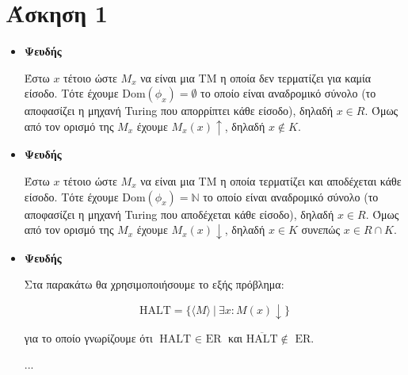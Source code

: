 \documentclass[a4paper, oneside, 11pt]{article}
\begin{document}
\section*{Άσκηση 1}

\begin{itemize}
   \item \textbf{Ψευδής}
   
         Έστω $x$ τέτοιο ώστε $M_x$ να είναι μια TM η οποία δεν τερματίζει για καμία
         είσοδο.  Τότε έχουμε $\text{Dom}(\phi_x) = \emptyset$ το οποίο είναι
         αναδρομικό σύνολο (το αποφασίζει η μηχανή Turing που απορρίπτει κάθε
         είσοδο), δηλαδή $x \in R$. Όμως από τον ορισμό της $M_x$ έχουμε $M_x(x)
         \uparrow$, δηλαδή $x \notin K$.

   \item \textbf{Ψευδής}

         Έστω $x$ τέτοιο ώστε $M_x$ να είναι μια TM η οποία τερματίζει και
         αποδέχεται κάθε είσοδο.
         Τότε έχουμε $\text{Dom}(\phi_x) = \mathbb{N}$ το οποίο είναι
         αναδρομικό σύνολο (το αποφασίζει η μηχανή Turing που αποδέχεται κάθε
         είσοδο), δηλαδή $x \in R$. Όμως από τον ορισμό της $M_x$ έχουμε $M_x(x)
         \downarrow$, δηλαδή $x \in K$ συνεπώς $x \in R \cap K$.

   \item \textbf{Ψευδής}

         Στα παρακάτω θα χρησιμοποιήσουμε το εξής πρόβλημα:

         \[ \text{HALT} = \{ \langle M \rangle\ |\ \exists x: M(x) \downarrow \} \]

         για το οποίο γνωρίζουμε ότι $\text{HALT } \in \text{ ER}$ και
         $\overline{\text{HALT} } \notin \text{ ER}$.

         ...
         
\end{itemize}
\end{document}
